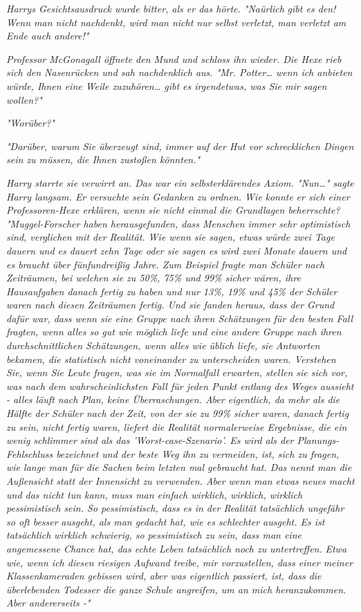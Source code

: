 {\emph{Harrys Gesichtsausdruck wurde bitter, als er das hörte. "\emph{Naürlich}} \emph{gibt es den! Wenn man nicht nachdenkt, wird man nicht nur selbst verletzt, man verletzt am Ende auch andere!"}

\emph{Professor McGonagall öffnete den Mund und schloss ihn wieder. Die Hexe rieb sich den Nasenrücken und sah nachdenklich aus. "Mr. Potter… wenn ich anbieten würde, Ihnen eine Weile zuzuhören… gibt es irgendetwas, was Sie mir sagen wollen?"}

\emph{"Worüber?"}

\emph{"Darüber, warum Sie überzeugt sind, immer auf der Hut vor schrecklichen Dingen sein zu müssen, die Ihnen zustoßen könnten."}

\emph{Harry starrte sie verwirrt an. Das war ein selbsterklärendes Axiom. "Nun…" sagte Harry langsam. Er versuchte sein Gedanken zu ordnen. Wie} \emph{\emph{konnte}} \emph{er sich einer Professoren-Hexe erklären, wenn sie nicht einmal die Grundlagen beherrschte? "Muggel-Forscher haben herausgefunden, dass Menschen immer sehr optimistisch sind, verglichen mit der Realität. Wie wenn sie sagen, etwas würde zwei Tage dauern und es dauert zehn Tage oder sie sagen es wird zwei Monate dauern und es braucht über fünfundreißig Jahre. Zum Beispiel fragte man Schüler nach Zeiträumen, bei welchen sie zu 50\%, 75\% und 99\% sicher wären, ihre Hausaufgaben danach fertig zu haben und nur 13\%, 19\% und 45\% der Schüler waren nach diesen Zeiträumen fertig. Und sie fanden heraus, dass der Grund dafür war, dass wenn sie eine Gruppe nach ihren Schätzungen für den besten Fall fragten, wenn alles so gut wie möglich liefe und eine andere Gruppe nach ihren durchschnittlichen Schätzungen, wenn alles wie üblich liefe, sie Antworten bekamen, die statistisch nicht voneinander zu unterscheiden waren. Verstehen Sie, wenn Sie Leute fragen, was sie im} \emph{\emph{Normalfall}} \emph{erwarten, stellen sie sich vor, was nach dem wahrscheinlichsten Fall für jeden Punkt entlang des Weges aussieht - alles läuft nach Plan, keine Überraschungen. Aber eigentlich, da mehr als die Hälfte der Schüler nach der Zeit, von der sie zu 99\% sicher waren, danach fertig zu sein, nicht fertig waren, liefert die Realität normalerweise Ergebnisse, die ein wenig schlimmer sind als das 'Worst-case-Szenario'. Es wird als der Planungs-Fehlschluss bezeichnet und der beste Weg ihn zu vermeiden, ist, sich zu fragen, wie lange man für die Sachen beim letzten mal gebraucht hat. Das nennt man die Außensicht statt der Innensicht zu verwenden. Aber wenn man etwas neues macht und das nicht tun kann, muss man einfach wirklich, wirklich, wirklich pessimistisch sein. So pessimistisch, dass es in der Realität tatsächlich ungefähr so oft} \emph{\emph{besser}} \emph{ausgeht, als man gedacht hat, wie es schlechter ausgeht. Es ist tatsächlich} \emph{\emph{wirklich schwierig, so}} \emph{pessimistisch zu sein, dass man eine angemessene Chance hat, das echte Leben tatsächlich noch zu} \emph{\emph{untertreffen.}} \emph{Etwa wie, wenn ich diesen riesigen} \emph{Aufwand treibe, mir vorzustellen, dass einer meiner Klassenkameraden gebissen wird, aber was eigentlich passiert, ist, dass die überlebenden Todesser die ganze Schule angreifen, um an mich heranzukommen. Aber andererseits -"}

}
